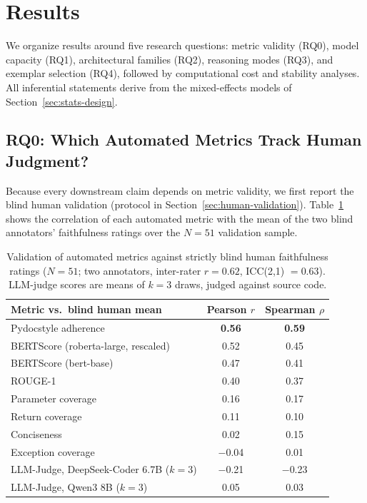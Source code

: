 \documentclass[pdflatex,sn-mathphys-ay]{sn-jnl}%
\theoremstyle{thmstyleone}%
\theoremstyle{thmstyletwo}%
\theoremstyle{thmstylethree}%
\begin{document}
{\color{blue}
\section{Results}
\label{sec:results}

We organize results around five research questions: metric validity (RQ0), model capacity (RQ1), architectural families (RQ2), reasoning modes (RQ3), and exemplar selection (RQ4), followed by computational cost and stability analyses. All inferential statements derive from the mixed-effects models of Section~\ref{sec:stats-design}.

\subsection{RQ0: Which Automated Metrics Track Human Judgment?}
\label{sec:rq0}
Because every downstream claim depends on metric validity, we first report the blind human validation (protocol in Section~\ref{sec:human-validation}). Table~\ref{tab:human-corr} shows the correlation of each automated metric with the mean of the two blind annotators' faithfulness ratings over the $N{=}51$ validation sample.

\begin{table}[h]
\centering
\small
\caption{Validation of automated metrics against strictly blind human faithfulness ratings ($N{=}51$; two annotators, inter-rater $r=0.62$, ICC(2,1) $=0.63$). LLM-judge scores are means of $k{=}3$ draws, judged against source code.}
\label{tab:human-corr}
\begin{tabular}{lcc}
\toprule
\textbf{Metric vs.\ blind human mean} & \textbf{Pearson $r$} & \textbf{Spearman $\rho$} \\
\midrule
Pydocstyle adherence                        & \textbf{0.56} & \textbf{0.59} \\
BERTScore (roberta-large, rescaled)         & 0.52          & 0.45 \\
BERTScore (bert-base)                       & 0.47          & 0.41 \\
ROUGE-1                                     & 0.40          & 0.37 \\
Parameter coverage                          & 0.16          & 0.17 \\
Return coverage                             & 0.11          & 0.10 \\
Conciseness                                 & 0.02          & 0.15 \\
Exception coverage                          & $-$0.04       & 0.01 \\
\midrule
LLM-Judge, DeepSeek-Coder 6.7B ($k{=}3$)    & $-$0.21       & $-$0.23 \\
LLM-Judge, Qwen3 8B ($k{=}3$)               & 0.05          & 0.03 \\
\bottomrule
\end{tabular}
\end{table}

}
\end{document}
